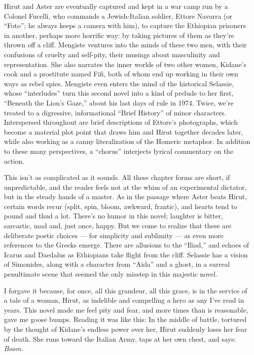 Hirut and Aster are eventually captured and kept in a war camp run by a
Colonel Fucelli, who commands a Jewish-Italian soldier, Ettore Navarra
(or ``Foto''; he always keeps a camera with him), to capture the
Ethiopian prisoners in another, perhaps more horrific way: by taking
pictures of them as they're thrown off a cliff. Mengiste ventures into
the minds of these two men, with their confusions of cruelty and
self-pity, their musings about masculinity and representation. She also
narrates the inner worlds of two other women, Kidane's cook and a
prostitute named Fifi, both of whom end up working in their own ways as
rebel spies. Mengiste even enters the mind of the historical Selassie,
whose ``interludes'' turn this second novel into a kind of prelude to
her first, ``Beneath the Lion's Gaze,'' about his last days of rule in
1974. Twice, we're treated to a digressive, informational ``Brief
History'' of minor characters. Interspersed throughout are brief
descriptions of Ettore's photographs, which become a material plot point
that draws him and Hirut together decades later, while also working as a
canny literalization of the Homeric metaphor. In addition to these many
perspectives, a ``chorus'' interjects lyrical commentary on the action.

This isn't as complicated as it sounds. All these chapter forms are
short, if unpredictable, and the reader feels not at the whim of an
experimental dictator, but in the steady hands of a master. As in the
passage where Aster beats Hirut, certain words recur (split, spin,
bloom, awkward, frantic), and hearts tend to pound and thud a lot.
There's no humor in this novel; laughter is bitter, sarcastic, mad and,
just once, happy. But we come to realize that these are deliberate
poetic choices --- for simplicity and sublimity --- as even more
references to the Greeks emerge. There are allusions to the ``Iliad,''
and echoes of Icarus and Daedalus as Ethiopians take flight from the
cliff. Selassie has a vision of Simonides, along with a character from
``Aida'' and a ghost, in a surreal penultimate scene that seemed the
only misstep in this majestic novel.

I forgave it because, for once, all this grandeur, all this grace, is in
the service of a tale of a woman, Hirut, as indelible and compelling a
hero as any I've read in years. This novel made me feel pity and fear,
and more times than is reasonable, gave me goose bumps. Reading it was
like this: In the middle of battle, tortured by the thought of Kidane's
endless power over her, Hirut suddenly loses her fear of death. She runs
toward the Italian Army, taps at her own chest, and says: \emph{Boom}.

